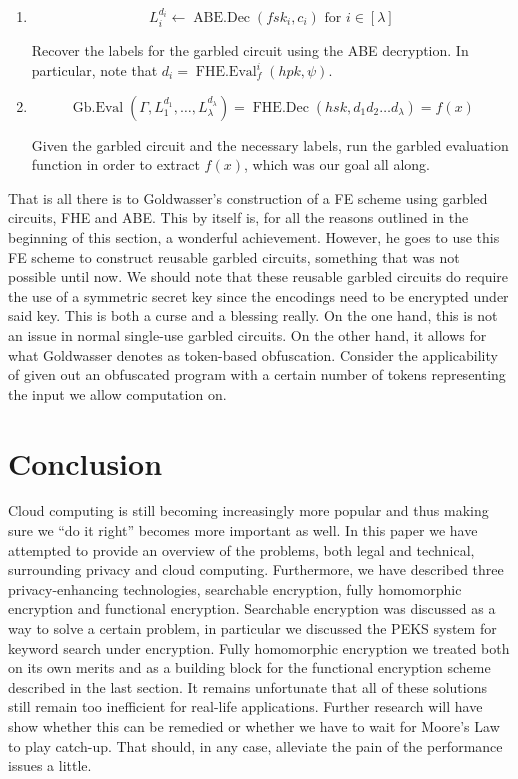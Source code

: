 \documentclass[11pt, a4paper]{article}
\newcommand{\op}[1]{\operatorname{#1}}
\begin{document}
\begin{enumerate}
    \item
        \[
            L_i^{d_i} \gets \op{ABE.Dec}(fsk_i, c_i) \text{ for } i \in [\lambda]
        \]

        Recover the labels for the garbled circuit using the ABE decryption. In particular, note that $d_i = \op{FHE.Eval}_f^i(hpk, \psi)$.
    \item
        \[
            \op{Gb.Eval}(\Gamma, L_1^{d_1}, \dots, L_{\lambda}^{d_{\lambda}}) = \op{FHE.Dec}(hsk, d_1 d_2 \dots d_{\lambda}) = f(x)
        \]

        Given the garbled circuit and the necessary labels, run the garbled evaluation function in order to extract $f(x)$, which was our goal all along.
\end{enumerate}

That is all there is to Goldwasser's construction of a FE scheme using garbled circuits, FHE and ABE.
This by itself is, for all the reasons outlined in the beginning of this section, a wonderful achievement.
However, he goes to use this FE scheme to construct reusable garbled circuits, something that was not possible until now.
We should note that these reusable garbled circuits do require the use of a symmetric secret key since the encodings need to be encrypted under said key.
This is both a curse and a blessing really.
On the one hand, this is not an issue in normal single-use garbled circuits.
On the other hand, it allows for what Goldwasser denotes as token-based obfuscation.
Consider the applicability of given out an obfuscated program with a certain number of tokens representing the input we allow computation on.

\section{Conclusion}
\label{sec:conclusion}

Cloud computing is still becoming increasingly more popular and thus making sure we ``do it right'' becomes more important as well.
In this paper we have attempted to provide an overview of the problems, both legal and technical, surrounding privacy and cloud computing.
Furthermore, we have described three privacy-enhancing technologies, searchable encryption, fully homomorphic encryption and functional encryption.
Searchable encryption was discussed as a way to solve a certain problem, in particular we discussed the PEKS system for keyword search under encryption.
Fully homomorphic encryption we treated both on its own merits and as a building block for the functional encryption scheme described in the last section.
It remains unfortunate that all of these solutions still remain too inefficient for real-life applications.
Further research will have show whether this can be remedied or whether we have to wait for Moore's Law to play catch-up.
That should, in any case, alleviate the pain of the performance issues a little.
\end{document}
